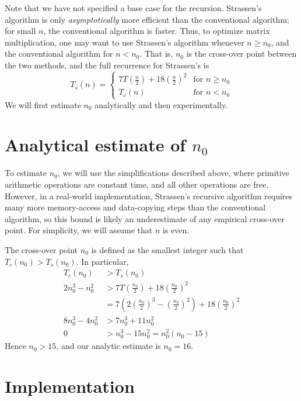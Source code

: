 \documentclass[10pt]{article}
\newcommand{\lp}{\left(}
\newcommand{\rp}{\right)}
\begin{document}
Note that we have not specified a base case for the recursion. Strassen's algorithm is only \emph{asymptotically} more efficient than the conventional algorithm; for small $n$, the conventional algorithm is faster. Thus, to optimize matrix multiplication, one may want to use Strassen's algorithm whenever $n \ge n_0$, and the conventional algorithm for $n < n_0$. That is, $n_0$ is the cross-over point between the two methods, and the full recurrence for Strassen's is
\begin{equation}
T_s(n) = 
\begin{cases}
7T\lp \frac{n}{2} \rp + 18\lp \frac{n}{2} \rp ^2 &\text{for $n \ge n_0$}\\
T_c(n) & \text{for $n < n_0$}
\end{cases}
\end{equation}
We will first estimate $n_0$ analytically and then experimentally. 
\\

\section{Analytical estimate of $n_0$}

To estimate $n_0$, we will use the simplifications described above, where primitive arithmetic operations are constant time, and all other operations are free. However, in a real-world implementation, Strassen's recursive algorithm requires many more memory-access and data-copying steps than the conventional algorithm, so this bound is likely an underestimate of any empirical cross-over point. For simplicity, we will assume that $n$ is even.

The cross-over point $n_0$ is defined as the smallest integer such that $T_c(n_0) > T_s(n_0)$. In particular, 
\begin{align*}
T_c(n_0) &> T_s(n_0)\\
2n_0^3 - n_0^2 &> 7T\lp \frac{n_0}{2} \rp + 18\lp \frac{n_0}{2} \rp ^2\\
&= 7\lp2\lp \frac{n_0}{2} \rp^3 - \lp \frac{n_0}{2} \rp^2\rp + 18\lp \frac{n_0}{2} \rp ^2\\
8n_0^3 - 4n_0^2 &> 7n_0^3 + 11 n_0^2 \\
0 &> n_0^3 - 15 n_0^2 = n_0^2(n_0-15)
\end{align*}
Hence $n_0 > 15$, and our analytic estimate is $n_0 = 16$.

\section {Implementation}
\end{document}
